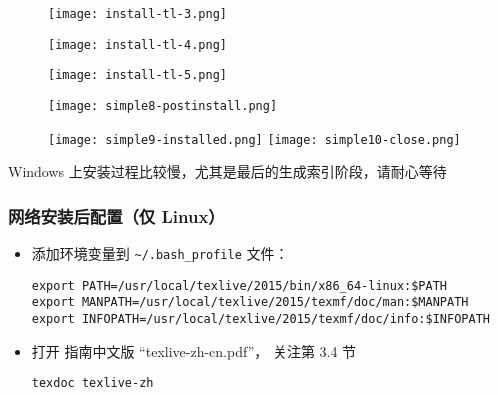 \begin{frame}
  \begin{figure}[h]
    \centering
    \texttt{[image: install-tl-3.png]}
  \end{figure}
\end{frame}


\begin{frame}
  \begin{figure}[h]
    \centering
    \texttt{[image: install-tl-4.png]}
  \end{figure}
\end{frame}

\begin{frame}
  \begin{figure}[h]
    \centering
    \texttt{[image: install-tl-5.png]}
  \end{figure}
\end{frame}

\begin{frame}
  \begin{figure}[h]
    \centering
    \texttt{[image: simple8-postinstall.png]}
  \end{figure}
\end{frame}

\begin{frame}
  \begin{figure}[h]
    \centering
    \texttt{[image: simple9-installed.png]}%
    \hspace{2em}
    \texttt{[image: simple10-close.png]}
  \end{figure}
  
  \centering Windows 上安装过程比较慢，尤其是最后的生成索引阶段，请耐心等待

\end{frame}

\begin{frame}[fragile]
  \frametitle{网络安装后配置（仅 Linux）}
  \begin{itemize}
    \item
      添加环境变量到 \nolinkurl{~/.bash_profile} 文件：
      \begin{verbatim}
export PATH=/usr/local/texlive/2015/bin/x86_64-linux:$PATH
export MANPATH=/usr/local/texlive/2015/texmf/doc/man:$MANPATH
export INFOPATH=/usr/local/texlive/2015/texmf/doc/info:$INFOPATH
      \end{verbatim}

  \item
    打开 \TeXLive 指南中文版 ``texlive-zh-cn.pdf''，
    关注第 3.4 节
      \begin{verbatim}
texdoc texlive-zh
    \end{verbatim}
  \end{itemize}
\end{frame}

